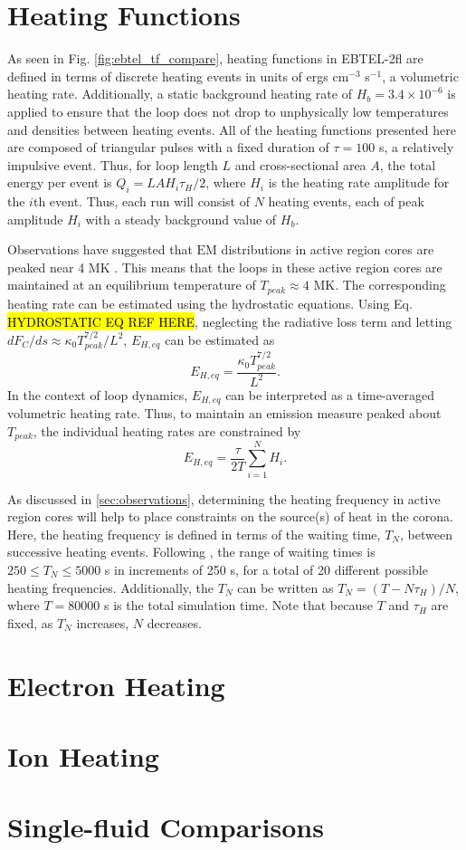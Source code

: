 \section{Heating Functions}
\label{sec:heating_funcs}
%
\par As seen in Fig. \ref{fig:ebtel_tf_compare}, heating functions in EBTEL-2fl are defined in terms of discrete heating events in units of ergs cm$^{-3}$ s$^{-1}$, a volumetric heating rate. Additionally, a static background heating rate of $H_b=3.4\times10^{-6}$ is applied to ensure that the loop does not drop to unphysically low temperatures and densities between heating events. All of the heating functions presented here are composed of triangular pulses with a fixed duration of $\tau=100$ s, a relatively impulsive event. Thus, for loop length $L$ and cross-sectional area $A$, the total energy per event is $Q_i=LAH_i\tau_H/2$, where $H_i$ is the heating rate amplitude for the $i$th event. Thus, each run will consist of $N$ heating events, each of peak amplitude $H_i$ with a steady background value of $H_b$.
%
\par Observations have suggested that $\mathrm{EM}$ distributions in active region cores are peaked near 4 MK \citep{warren_constraints_2011,warren_systematic_2012}. This means that the loops in these active region cores are maintained at an equilibrium temperature of $T_{peak}\approx4$ MK. The corresponding heating rate can be estimated using the hydrostatic equations. Using Eq. \hl{HYDROSTATIC EQ REF HERE}, neglecting the radiative loss term and letting $dF_C/ds\approx\kappa_0T_{peak}^{7/2}/L^2$, $E_{H,eq}$ can be estimated as 
\begin{equation}
	E_{H,eq}=\frac{\kappa_0T_{peak}^{7/2}}{L^2}.
\end{equation}
In the context of loop dynamics, $E_{H,eq}$ can be interpreted as a time-averaged volumetric heating rate. Thus, to maintain an emission measure peaked about $T_{peak}$, the individual heating rates are constrained by 
\begin{equation}
	E_{H,eq} = \frac{\tau}{2T}\sum_{i=1}^NH_i.
\end{equation}
%
\par As discussed in \ref{sec:observations}, determining the heating frequency in active region cores will help to place constraints on the source(s) of heat in the corona. Here, the heating frequency is defined in terms of the waiting time, $T_N$, between successive heating events. Following \citet{cargill_active_2014}, the range of waiting times is $250\le T_N\le5000$ s in increments of 250 s, for a total of 20 different possible heating frequencies. Additionally, the $T_N$ can be written as $T_N=(T-N\tau_H)/N$, where $T=80000$ s is the total simulation time. Note that because $T$ and $\tau_H$ are fixed, as $T_N$ increases, $N$ decreases.
%
\section{Electron Heating}
\label{sec:electron_heating}
%
\section{Ion Heating}
\label{sec:ion_heating}
%
\section{Single-fluid Comparisons}
\label{sec:single_fluid}
